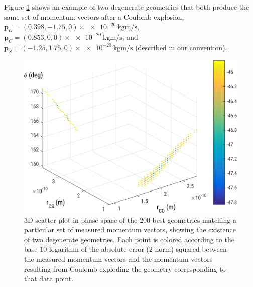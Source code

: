 Figure \ref{fig:rainbow} shows an example of two degenerate geometries that both produce the same set of momentum vectors after a Coulomb explosion, $\mathbf{p}_O = (0.398, -1.75, 0) \times \SI[per-mode=symbol]{e-20}{\kilogram\metre\per\second}$, $\mathbf{p}_C = (0.853, 0, 0) \times \SI[per-mode=symbol]{e-20}{\kilogram\metre\per\second}$, and $\mathbf{p}_S = (-1.25, 1.75, 0) \times \SI[per-mode=symbol]{e-20}{\kilogram\metre\per\second}$ (described in our convention).
\begin{figure}
  \centering
  \includegraphics[width=\textwidth]{Plots/rainbow}
  \caption[3D scatter plot in phase space of the $200$ best geometries matching a particular set of measured momentum vectors, showing the existence of two degenerate geometries.]
  {3D scatter plot in phase space of the $200$ best geometries matching a particular set of measured momentum vectors, showing the existence of two degenerate geometries. Each point is colored according to the base-$10$ logarithm of the absolute error ($2$-norm) squared between the measured momentum vectors and the momentum vectors resulting from Coulomb exploding the geometry corresponding to that data point.}
  \label{fig:rainbow}
\end{figure}

